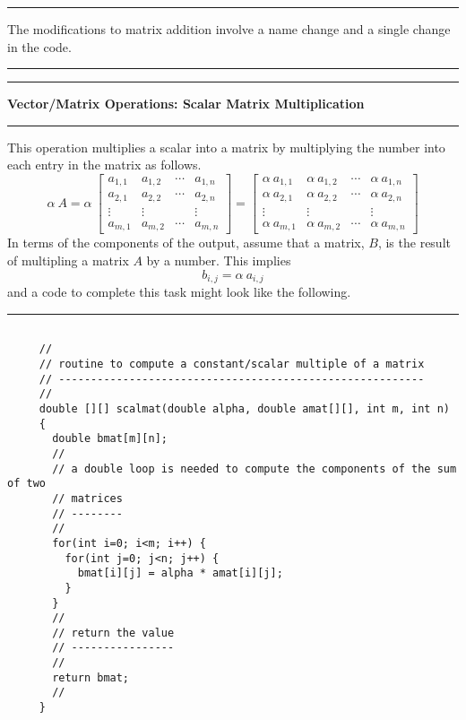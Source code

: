 \documentclass[10pt,fleqn]{article}
\begin{document}
\vskip0.1in\hrule\vskip0.1in
\noindent
The modifications to matrix addition involve a name change and a single change
in the code.
\vskip0.1in\hrule\vskip0.1in
\newpage
\vskip0.1in\hrule\vskip0.1in
\noindent
{\bf Vector/Matrix Operations: Scalar Matrix Multiplication}
\vskip0.1in\hrule\vskip0.1in
\noindent
This operation multiplies a scalar into a matrix by multiplying the number into
each entry in the matrix as follows.
$$
  \alpha\ A =
   \alpha\ \left[
     \begin{array}{cccc}
       a_{1,1} & a_{1,2} & \cdots & a_{1,n} \\
       a_{2,1} & a_{2,2} & \cdots & a_{2,n} \\
       \vdots  & \vdots  &  \    & \vdots  \\
       a_{m,1} & a_{m,2} & \cdots & a_{m,n}
     \end{array}
   \right] 
 = \left[
     \begin{array}{cccc}
       \alpha\ a_{1,1} & \alpha\ a_{1,2} & \cdots & \alpha\ a_{1,n} \\
       \alpha\ a_{2,1} & \alpha\ a_{2,2} & \cdots & \alpha\ a_{2,n} \\
       \vdots  & \vdots  &  \ & \vdots  \\
       \alpha\ a_{m,1} & \alpha\ a_{m,2} & \cdots & \alpha\ a_{m,n}
     \end{array}
   \right] 
$$
In terms of the components of the output, assume that a matrix, $B$, is the
result of multipling a matrix $A$ by a number. This implies
$$
  b_{i,j} = \alpha\ a_{i,j}
$$
and a code to complete this task might look like the following.
\vskip0.1in\hrule\vskip0.1in
\begin{verbatim}

     //
     // routine to compute a constant/scalar multiple of a matrix
     // ---------------------------------------------------------
     //
     double [][] scalmat(double alpha, double amat[][], int m, int n)
     {
       double bmat[m][n];
       //
       // a double loop is needed to compute the components of the sum of two
       // matrices
       // --------
       //
       for(int i=0; i<m; i++) {
         for(int j=0; j<n; j++) {
           bmat[i][j] = alpha * amat[i][j];
         }
       }
       //
       // return the value
       // ----------------
       //
       return bmat;
       //
     }

\end{verbatim}
\end{document}
